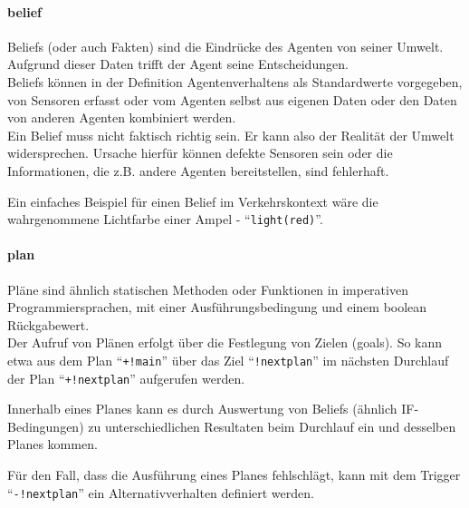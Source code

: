 \paragraph*{belief}
Beliefs (oder auch Fakten) sind die Eindrücke des Agenten von seiner Umwelt.
Aufgrund dieser Daten trifft der Agent seine Entscheidungen.
\\
Beliefs können in der Definition Agentenverhaltens als Standardwerte vorgegeben, von Sensoren erfasst oder vom Agenten selbst aus eigenen Daten oder den Daten von anderen Agenten kombiniert werden.
\\
Ein Belief muss nicht faktisch richtig sein.
Er kann also der Realität der Umwelt widersprechen. 
Ursache hierfür können defekte Sensoren sein oder die Informationen, die z.B. andere Agenten bereitstellen, sind fehlerhaft.

Ein einfaches Beispiel für einen Belief im Verkehrskontext wäre die wahrgenommene Lichtfarbe einer Ampel - \enquote{\texttt{light(red)}}.

\paragraph*{plan}
Pläne sind ähnlich statischen Methoden oder Funktionen in imperativen Programmiersprachen, mit einer Ausführungsbedingung und einem boolean Rückgabewert.
\\
Der Aufruf von Plänen erfolgt über die Festlegung von Zielen (goals).
So kann etwa aus dem Plan \enquote{\texttt{+!main}} über das Ziel \enquote{\texttt{!nextplan}} im nächsten Durchlauf der Plan \enquote{\texttt{+!nextplan}} aufgerufen werden.

Innerhalb eines Planes kann es durch Auswertung von Beliefs (ähnlich IF-Bedingungen) zu unterschiedlichen Resultaten beim Durchlauf ein und desselben Planes kommen.

Für den Fall, dass die Ausführung eines Planes fehlschlägt, kann mit dem Trigger \enquote{\texttt{-!nextplan}} ein Alternativverhalten definiert werden.